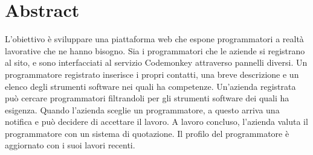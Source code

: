 \section {Abstract}

L'obiettivo è sviluppare una piattaforma web che espone programmatori a realtà lavorative che ne hanno bisogno.
Sia i programmatori che le aziende si registrano al sito, e sono interfacciati al servizio Codemonkey attraverso pannelli diversi.
Un programmatore registrato inserisce i propri contatti, una breve descrizione e un elenco degli strumenti software nei quali ha competenze.
Un'azienda registrata può cercare programmatori filtrandoli per gli strumenti software dei quali ha esigenza. Quando l'azienda sceglie un programmatore, a questo arriva una notifica e può decidere di accettare il lavoro.
A lavoro concluso, l'azienda valuta il programmatore con un sistema di quotazione.
Il profilo del programmatore è aggiornato con i suoi lavori recenti.